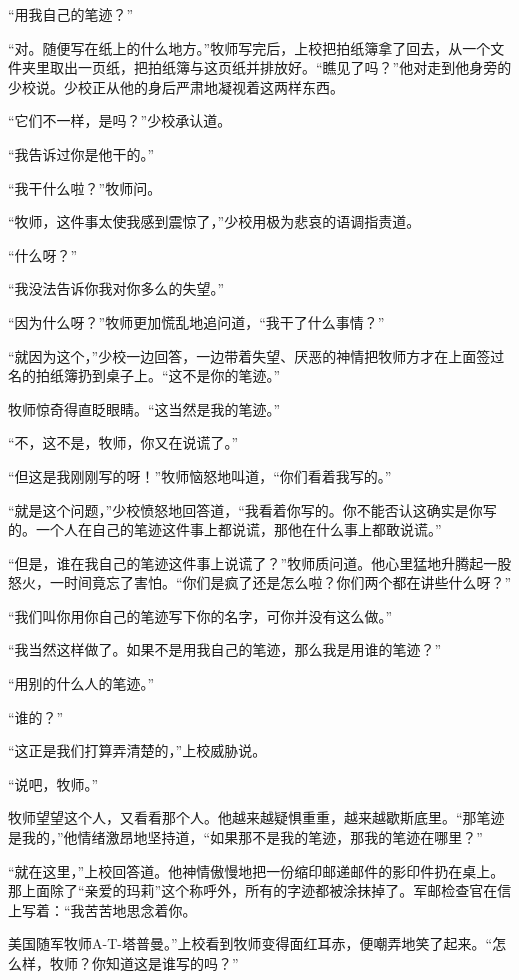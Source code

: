     “用我自己的笔迹？”

    “对。随便写在纸上的什么地方。”牧师写完后，上校把拍纸簿拿了回去，从一个文件夹里取出一页纸，把拍纸簿与这页纸并排放好。“瞧见了吗？”他对走到他身旁的少校说。少校正从他的身后严肃地凝视着这两样东西。

    “它们不一样，是吗？”少校承认道。

    “我告诉过你是他干的。”

    “我干什么啦？”牧师问。

    “牧师，这件事太使我感到震惊了，”少校用极为悲哀的语调指责道。

    “什么呀？”

    “我没法告诉你我对你多么的失望。”

    “因为什么呀？”牧师更加慌乱地追问道，“我干了什么事情？”

    “就因为这个，”少校一边回答，一边带着失望、厌恶的神情把牧师方才在上面签过名的拍纸簿扔到桌子上。“这不是你的笔迹。”

    牧师惊奇得直眨眼睛。“这当然是我的笔迹。”

    “不，这不是，牧师，你又在说谎了。”

    “但这是我刚刚写的呀！”牧师恼怒地叫道，“你们看着我写的。”

    “就是这个问题，”少校愤怒地回答道，“我看着你写的。你不能否认这确实是你写的。一个人在自己的笔迹这件事上都说谎，那他在什么事上都敢说谎。”

    “但是，谁在我自己的笔迹这件事上说谎了？”牧师质问道。他心里猛地升腾起一股怒火，一时间竟忘了害怕。“你们是疯了还是怎么啦？你们两个都在讲些什么呀？”

    “我们叫你用你自己的笔迹写下你的名字，可你并没有这么做。”

    “我当然这样做了。如果不是用我自己的笔迹，那么我是用谁的笔迹？”

    “用别的什么人的笔迹。”

    “谁的？”

    “这正是我们打算弄清楚的，”上校威胁说。

    “说吧，牧师。”

    牧师望望这个人，又看看那个人。他越来越疑惧重重，越来越歇斯底里。“那笔迹是我的，”他情绪激昂地坚持道，“如果那不是我的笔迹，那我的笔迹在哪里？”

    “就在这里，”上校回答道。他神情傲慢地把一份缩印邮递邮件的影印件扔在桌上。那上面除了“亲爱的玛莉”这个称呼外，所有的字迹都被涂抹掉了。军邮检查官在信上写着：“我苦苦地思念着你。
 


    美国随军牧师A-T-塔普曼。”上校看到牧师变得面红耳赤，便嘲弄地笑了起来。“怎么样，牧师？你知道这是谁写的吗？”


